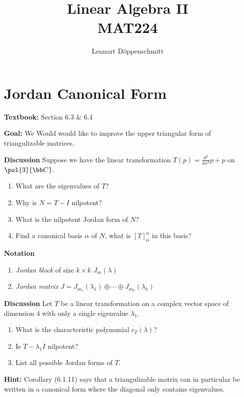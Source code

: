 \documentclass[letterpaper, 10pt]{article}
\begin{document}

\title{Linear Algebra II \\ \Large{MAT224}}
\author{Lennart Döppenschmitt}

\section*{Jordan Canonical Form}%
\textbf{Textbook:} Section 6.3 \& 6.4

\lb
\textbf{Goal:} We Would would like to improve the upper triangular form of
triangulizable matrices.


\lb
\textbf{Discussion}
\lb
Suppose we have the linear transformation $T(p) = \frac{d^2}{dx^2} p + p$ on $\pol{3}{\bb C}$.
\begin{enumerate}
    \item What are the eigenvalues of $T$?
    \item Why is $N = T - I$ nilpotent?
    \item What is the nilpotent Jordan form of $N$?
    \item Find a canonical basis $α$ of $N$, what is $[T]_α^α$ in this basis?
\end{enumerate}

\newpage
\lb
\textbf{Notation}
\lb
\begin{enumerate}
    \item \emph{Jordan block} of size $k \times k$ $J_m(λ)$
    \vspace{140pt}
\item \emph{Jordan matrix} $J = J_{m_1}(λ_1) \oplus \cdots \oplus J_{m_k}(λ_k)$
\end{enumerate}



\vspace{200pt}
\lb
\textbf{Discussion}
\lb
Let $T$ be a linear transformation on a complex vector space of dimension $4$ with only a single
eigenvalue $λ_1$.
\begin{enumerate}
    \item What is the characteristic polynomial $c_T(λ)$?
    \item Is $T- λ_1 I$ nilpotent?
    \item List all possible Jordan forms of $T$.
\end{enumerate}
\textbf{Hint: } Corollary (6.1.11) says that a triangulizable matrix can in particular be written
in a canonical form where the diagonal only contains eigenvalues.
\end{document}
